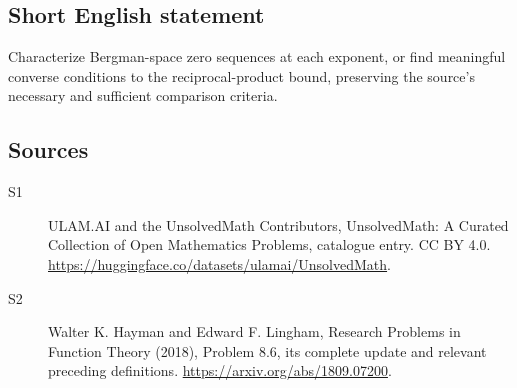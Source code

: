 \documentclass[11pt]{article}
\begin{document}
\subsection{Short English statement}
Characterize Bergman-space zero sequences at each exponent, or find meaningful converse conditions to the reciprocal-product bound, preserving the source’s necessary and sufficient comparison criteria.
\subsection{Sources}
\begin{description}
\item[\hypertarget{source:statement:1}{S1}] ULAM.AI and the UnsolvedMath Contributors, UnsolvedMath: A Curated Collection of Open Mathematics Problems, catalogue entry. CC BY 4.0. \url{https://huggingface.co/datasets/ulamai/UnsolvedMath}.
\item[\hypertarget{source:statement:2}{S2}] Walter K. Hayman and Edward F. Lingham, Research Problems in Function Theory (2018), Problem 8.6, its complete update and relevant preceding definitions. \url{https://arxiv.org/abs/1809.07200}.
\end{description}
\label{end:statement}
\end{document}
